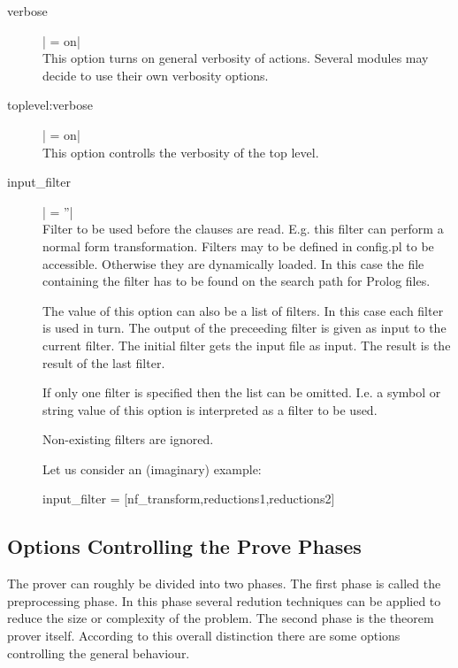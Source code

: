 \begin{description}
  \item [verbose] | = on|\\
	This option turns on general verbosity of actions. Several modules may
	decide to use their own verbosity options.

  \item [toplevel:verbose] | = on|\\
	This option controlls the verbosity of the top level.


  \item [input\_filter] | = ''|\label{opt:input_filter}\\
	Filter to be used before the clauses are read. E.g. this filter can
	perform a normal form transformation. Filters may to be defined in
	{\sf config.pl} to be accessible. Otherwise they are dynamically
        loaded. In this case the file containing the filter has to be found on
        the search path for Prolog files.

	The value of this option can also be a list of filters. In this case
	each filter is used in turn. The output of the preceeding filter is
	given as input to the current filter. The initial filter gets the
	input file as input. The result is the result of the last filter.

        If only one filter is specified then the list can be omitted. I.e. a
        symbol or string value of this option is interpreted as a filter to be
        used.

	Non-existing filters are ignored.

	Let us consider an (imaginary) example:

\begin{BoxedSample}
  input\_filter = [nf\_transform,reductions1,reductions2]
\end{BoxedSample}

\end{description}

\subsection{Options Controlling the Prove Phases}

The prover can roughly be divided into two phases. The first phase is called
the preprocessing phase. In this phase several redution techniques can be
applied to reduce the size or complexity of the problem. The second phase is
the theorem prover itself. According to this overall distinction there are
some options controlling the general behaviour.

